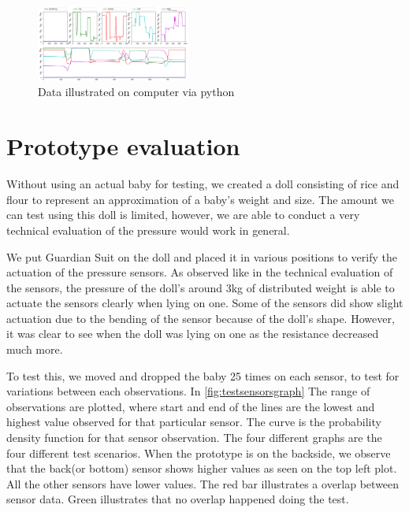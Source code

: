 \documentclass{sigchi-ext}
\begin{document}
\begin{figure}
   \centering \includegraphics[width=0.45\textwidth]{img/all_sensors}
    \caption{Data illustrated on computer via python}
    \label{fig:pyprogram}
\end{figure}




\section{Prototype evaluation}

Without using an actual baby for testing, we created a
doll consisting of rice and flour to represent an
approximation of a baby's weight and size. The amount we 
can test using this doll is limited, however, we are able 
to conduct a very technical evaluation of the pressure 
would work in general.

We put Guardian Suit on the doll and placed it in various
positions to verify the actuation of the pressure sensors.
As observed like in the technical evaluation of the sensors,
the pressure of the doll's around 3kg of distributed weight
is able to actuate the sensors clearly when lying on one. 
Some of the sensors did show slight actuation due to the
bending of the sensor because of the doll's shape. However,
it was clear to see when the doll was lying on one as the 
resistance decreased much more.

To test this, we moved and dropped the baby 25 times on each sensor, 
to test for variations between each observations. In \autoref{fig:testsensorsgraph}
The range of observations are plotted, where start and end of the lines are the lowest and highest value observed for that particular sensor.
The curve is the probability density function for that sensor observation. The four different graphs are the four different test scenarios. 
When the prototype is on the backside, we observe that the back(or bottom) sensor shows higher values as seen on the top left plot. All the other
sensors have lower values. The red bar illustrates a overlap between sensor data. Green illustrates that no overlap happened doing the test. 
\end{document}
